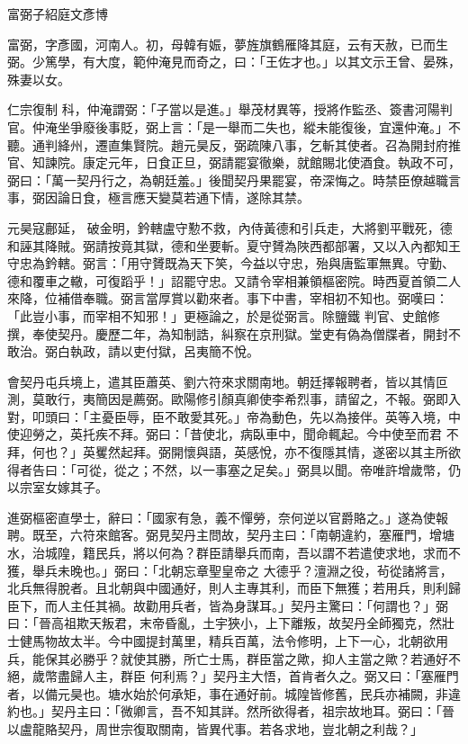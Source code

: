 
\begin{pinyinscope}

 富弼子紹庭文彥博



 富弼，字彥國，河南人。初，母韓有娠，夢旌旗鶴雁降其庭，云有天赦，已而生弼。少篤學，有大度，範仲淹見而奇之，曰：「王佐才也。」以其文示王曾、晏殊，殊妻以女。



 仁宗復制
 科，仲淹謂弼：「子當以是進。」舉茂材異等，授將作監丞、簽書河陽判官。仲淹坐爭廢後事貶，弼上言：「是一舉而二失也，縱未能復後，宜還仲淹。」不聽。通判絳州，遷直集賢院。趙元昊反，弼疏陳八事，乞斬其使者。召為開封府推官、知諫院。康定元年，日食正旦，弼請罷宴徹樂，就館賜北使酒食。執政不可，弼曰：「萬一契丹行之，為朝廷羞。」後聞契丹果罷宴，帝深悔之。時禁臣僚越職言事，弼因論日食，極言應天變莫若通下情，遂除其禁。



 元昊寇鄜延，
 破金明，鈐轄盧守懃不救，內侍黃德和引兵走，大將劉平戰死，德和誣其降賊。弼請按竟其獄，德和坐要斬。夏守贇為陜西都部署，又以入內都知王守忠為鈐轄。弼言：「用守贇既為天下笑，今益以守忠，殆與唐監軍無異。守勤、德和覆車之轍，可復蹈乎！」詔罷守忠。又請令宰相兼領樞密院。時西夏首領二人來降，位補借奉職。弼言當厚賞以勸來者。事下中書，宰相初不知也。弼嘆曰：「此豈小事，而宰相不知邪！」更極論之，於是從弼言。除鹽鐵
 判官、史館修撰，奉使契丹。慶歷二年，為知制誥，糾察在京刑獄。堂吏有偽為僧牒者，開封不敢治。弼白執政，請以吏付獄，呂夷簡不悅。



 會契丹屯兵境上，遣其臣蕭英、劉六符來求關南地。朝廷擇報聘者，皆以其情叵測，莫敢行，夷簡因是薦弼。歐陽修引顏真卿使李希烈事，請留之，不報。弼即入對，叩頭曰：「主憂臣辱，臣不敢愛其死。」帝為動色，先以為接伴。英等入境，中使迎勞之，英托疾不拜。弼曰：「昔使北，病臥車中，聞命輒起。今中使至而君
 不拜，何也？」英矍然起拜。弼開懷與語，英感悅，亦不復隱其情，遂密以其主所欲得者告曰：「可從，從之；不然，以一事塞之足矣。」弼具以聞。帝唯許增歲幣，仍以宗室女嫁其子。



 進弼樞密直學士，辭曰：「國家有急，義不憚勞，奈何逆以官爵賂之。」遂為使報聘。既至，六符來館客。弼見契丹主問故，契丹主曰：「南朝違約，塞雁門，增塘水，治城隍，籍民兵，將以何為？群臣請舉兵而南，吾以謂不若遣使求地，求而不獲，舉兵未晚也。」弼曰：「北朝忘章聖皇帝之
 大德乎？澶淵之役，茍從諸將言，北兵無得脫者。且北朝與中國通好，則人主專其利，而臣下無獲；若用兵，則利歸臣下，而人主任其禍。故勸用兵者，皆為身謀耳。」契丹主驚曰：「何謂也？」弼曰：「晉高祖欺天叛君，末帝昏亂，土宇狹小，上下離叛，故契丹全師獨克，然壯士健馬物故太半。今中國提封萬里，精兵百萬，法令修明，上下一心，北朝欲用兵，能保其必勝乎？就使其勝，所亡士馬，群臣當之歟，抑人主當之歟？若通好不絕，歲幣盡歸人主，群臣
 何利焉？」契丹主大悟，首肯者久之。弼又曰：「塞雁門者，以備元昊也。塘水始於何承矩，事在通好前。城隍皆修舊，民兵亦補闕，非違約也。」契丹主曰：「微卿言，吾不知其詳。然所欲得者，祖宗故地耳。弼曰：「晉以盧龍賂契丹，周世宗復取關南，皆異代事。若各求地，豈北朝之利哉？」




\end{pinyinscope}
